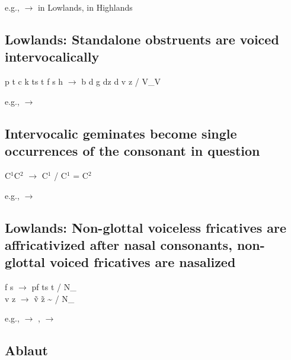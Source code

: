 e.g.,   $\to$  in Lowlands,  in Highlands

\subsection{{\sc Lowlands:} Standalone obstruents are voiced intervocalically} 

\begin{center}
    p t c k t\tiebar s t\tiebar\esh{} f s \esh{} h $\to$ b d \paljstop{} g d\tiebar z d\tiebar\ezh{} v z \ezh{} \voih{} / V\_V
\end{center}

e.g.,   $\to$  

\subsection{Intervocalic geminates become single occurrences of the consonant in question}

\begin{center}
    C$^1$C$^2$ $\to$ C$^1$ / C$^1$ = C$^2$
\end{center}

e.g.,   $\to$ 

\subsection{{\sc Lowlands:} Non-glottal voiceless fricatives are affricativized after nasal consonants, non-glottal voiced fricatives are nasalized}

\begin{center}
    f s \esh{} $\to$ p\tiebar f t\tiebar s t\tiebar\esh{} / N\_ \\[0.1cm]
    v z \ezh{} $\to$ \~{v} \~{z} \~{\ezh} / N\_
\end{center}

e.g.,   $\to$ ,   $\to$ 

\subsection{Ablaut}

